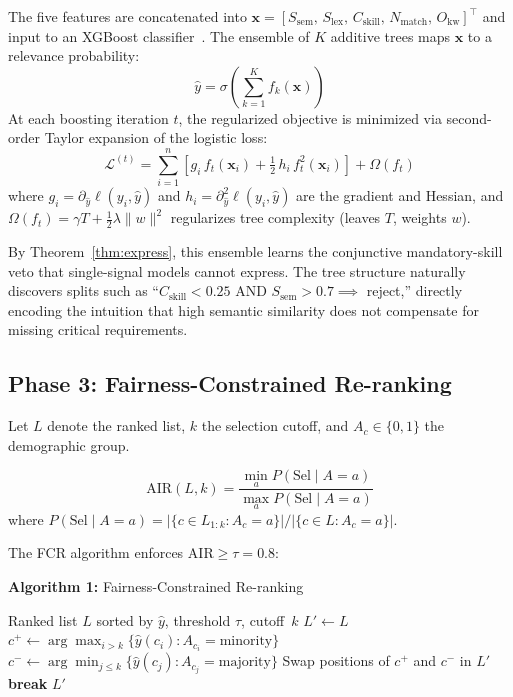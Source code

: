 \documentclass{llncs}
\begin{document}
The five features are concatenated into $\mathbf{x} = [S_{\mathrm{sem}},\, S_{\mathrm{lex}},\, C_{\mathrm{skill}},\, N_{\mathrm{match}},\, O_{\mathrm{kw}}]^\top$ and input to an XGBoost classifier~\cite{chen2016xgboost}. The ensemble of $K$ additive trees maps $\mathbf{x}$ to a relevance probability:
\begin{equation}
    \hat{y} = \sigma\!\left(\sum_{k=1}^K f_k(\mathbf{x})\right)
\end{equation}
At each boosting iteration $t$, the regularized objective is minimized via second-order Taylor expansion of the logistic loss:
\begin{equation}\label{eq:xgb}
    \mathcal{L}^{(t)} = \sum_{i=1}^n \left[ g_i\, f_t(\mathbf{x}_i) + \tfrac{1}{2}\, h_i\, f_t^2(\mathbf{x}_i) \right] + \Omega(f_t)
\end{equation}
where $g_i = \partial_{\hat{y}} \ell(y_i, \hat{y})$ and $h_i = \partial^2_{\hat{y}} \ell(y_i, \hat{y})$ are the gradient and Hessian, and $\Omega(f_t) = \gamma T + \frac{1}{2}\lambda\|w\|^2$ regularizes tree complexity (leaves $T$, weights $w$).

By Theorem~\ref{thm:express}, this ensemble learns the conjunctive mandatory-skill veto that single-signal models cannot express. The tree structure naturally discovers splits such as ``$C_\text{skill} < 0.25$ AND $S_\text{sem} > 0.7 \implies$ reject,'' directly encoding the intuition that high semantic similarity does not compensate for missing critical requirements.

\subsection{Phase 3: Fairness-Constrained Re-ranking}\label{sec:fcr_method}

Let $L$ denote the ranked list, $k$ the selection cutoff, and $A_c \in \{0, 1\}$ the demographic group.

\begin{definition}
\begin{equation}
    \mathrm{AIR}(L, k) = \frac{\min_a P(\text{Sel} \mid A{=}a)}{\max_a P(\text{Sel} \mid A{=}a)}
\end{equation}
where $P(\text{Sel} \mid A{=}a) = |\{c \in L_{1:k} : A_c = a\}| / |\{c \in L : A_c = a\}|$.
\end{definition}

The FCR algorithm enforces $\mathrm{AIR} \geq \tau = 0.8$:

\vspace{3pt}
\noindent\textbf{Algorithm 1:} Fairness-Constrained Re-ranking
\begin{algorithmic}[1]
\REQUIRE Ranked list $L$ sorted by $\hat{y}$, threshold $\tau$, cutoff~$k$
\STATE $L' \leftarrow L$
    \STATE $c^+ \leftarrow \arg\max_{i > k}\{\hat{y}(c_i) : A_{c_i} = \text{minority}\}$
    \STATE $c^- \leftarrow \arg\min_{j \leq k}\{\hat{y}(c_j) : A_{c_j} = \text{majority}\}$
        \STATE Swap positions of $c^+$ and $c^-$ in $L'$
    \ELSE
        \STATE \textbf{break}
    \ENDIF
\ENDWHILE
\RETURN $L'$
\end{algorithmic}
\vspace{3pt}
\end{document}
